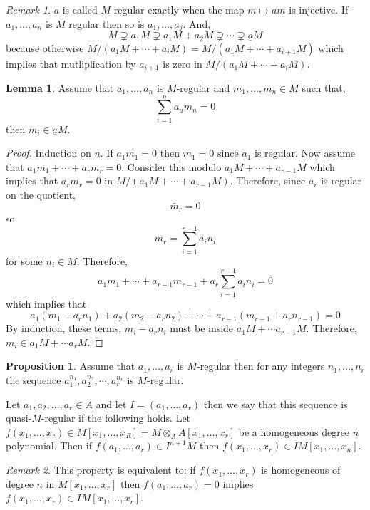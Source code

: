 \documentclass[12pt]{article}
\theoremstyle{remark}
\newtheorem*{remark}{Remark}
\theoremstyle{definition}
\newtheorem{lemma}[theorem]{Lemma}
\newtheorem{proposition}[theorem]{Proposition}
\newenvironment{definition}[1][Definition:]{\begin{trivlist}
\item[\hskip \labelsep {\bfseries #1}]}{\end{trivlist}}
\begin{document}
\begin{remark}
$a$ is called $M$-regular exactly when the map $m \mapsto a m$ is injective. If $a_1, \dots, a_n$ is $M$ regular then so is $a_1, \dots, a_j$. And,
\[ M \supsetneq a_1 M \supsetneq a_1 M + a_2 M \supsetneq \cdots \supsetneq \underline{a} M \] 
because otherwise $M / (a_1 M + \cdots + a_i M) = M / (a_1 M + \cdots + a_{i+1} M)$ which implies that mutliplication by $a_{i+1}$ is zero in $M / (a_1 M + \cdots + a_i M)$. 
\end{remark}

\begin{lemma}
Assume that $a_1, \dots, a_n$ is $M$-regular and $m_1, \dots, m_n \in M$ such that,
\[ \sum_{i = 1}^n a_u m_n = 0 \]
then $m_i \in \underline{a} M$.
\end{lemma}

\begin{proof}
Induction on $n$. If $a_1 m_1 = 0$ then $m_1 = 0$ since $a_1$ is regular. Now assume that $a_1 m_1 + \cdots + a_r m_r = 0$. Consider this modulo $a_1 M + \cdots + a_{r-1} M$ which implies that $\bar{a}_r \bar{m}_r = 0$ in $M / (a_1 M + \cdots + a_{r-1} M)$. Therefore, since $a_r$ is regular on the quotient,
\[ \bar{m}_r = 0 \]
so
\[ m_r = \sum_{i = 1}^{r-1} a_i n_i \]
for some $n_i \in M$. Therefore,
\[ a_1 m_1 + \cdots + a_{r-1} m_{r-1} + a_r \sum_{i = 1}^{r-1} a_i n_i = 0 \]
which implies that
\[ a_1(m_1 - a_r n_1) + a_2( m_2 - a_r n_2) + \cdots + a_{r-1} (m_{r-1} + a_r n_{r-1}) = 0 \] 
By induction, these terms, $m_i - a_r n_i$ must be inside $a_1 M + \cdots a_{r - 1}M$. Therefore, $m_i \in a_1 M + \cdots a_r M$. 
\end{proof}

\begin{proposition}
Assume that $a_1, \dots, a_r$ is $M$-regular then for any integers $n_1, \dots, n_r$ the sequence $a_1^{n_1}, a_2^{n_2}, \cdots, a_r^{n_r}$ is $M$-regular. 
\end{proposition}

\begin{definition}
Let $a_1, a_2, \dots, a_r \in A$ and let $I = (a_1, \dots, a_r)$ then we say that this sequence is quasi-$M$-regular if the following holds. Let $f(x_1, \dots, x_r) \in M[x_1, \dots, x_R] = M \otimes_A A[x_1, \dots, x_r]$ be a homogeneous degree $n$ polynomial. Then if $f(a_1, \dots, a_r) \in I^{n+1} M$ then $f(x_1, \dots, x_r) \in I M[x_1, \dots, x_n]$.
\end{definition}

\begin{remark}
This property is equivalent to: if $f(x_1, \dots, x_r)$ is homogeneous of degree $n$ in $M[x_1, \dots, x_r]$ then $f(a_1, \dots, a_r) = 0$ implies $f(x_1, \dots, x_r) \in IM[x_1, \dots, x_r]$. 
\end{remark}
\end{document}

